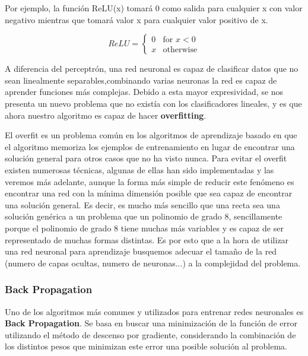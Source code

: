 Por ejemplo, la función ReLU(x) tomará 0 como salida para cualquier x con valor negativo mientras que tomará valor x para cualquier valor positivo de x.

\[
  ReLU =
  \begin{cases}
    0 & \text{for } x < 0 \\
    x & \text{otherwise}
  \end{cases}
\]

A diferencia del perceptrón, una red neuronal es capaz de clasificar datos que no sean linealmente separables,combinando varias neuronas la red es capaz de aprender funciones más complejas. Debido a esta mayor expresividad, se nos presenta un nuevo problema que no existía con los clasificadores lineales, y es que ahora nuestro algoritmo es capaz de hacer \textbf{overfitting}. 

El overfit es un problema común en los algoritmos de aprendizaje basado en que el algoritmo memoriza los ejemplos de entrenamiento en lugar de encontrar una solución general para otros casos que no ha visto nunca. Para evitar el overfit existen numerosas técnicas, algunas de ellas han sido implementadas y las veremos más adelante, aunque la forma más simple de reducir este fenómeno es encontrar una red con la mínima dimensión posible que sea capaz de encontrar una solución general. Es decir, es mucho más sencillo que una recta sea una solución genérica a un problema que un polinomio de grado 8, sencillamente porque el polinomio de grado 8 tiene muchas más variables y es capaz de ser representado de muchas formas distintas. Es por esto que a la hora de utilizar una red neuronal para aprendizaje busquemos adecuar el tamaño de la red (numero de capas ocultas, numero de neuronas...) a la complejidad del problema.

\newpage
\subsubsection{Back Propagation}
\label{subsubsec:nn:backprop}

Uno de los algoritmos más comunes y utilizados para entrenar redes neuronales es \textbf{Back Propagation}. Se basa en buscar una minimización de la función de error utilizando el método de descenso por gradiente, considerando la combinación de los distintos pesos que minimizan este error una posible solución al problema.


